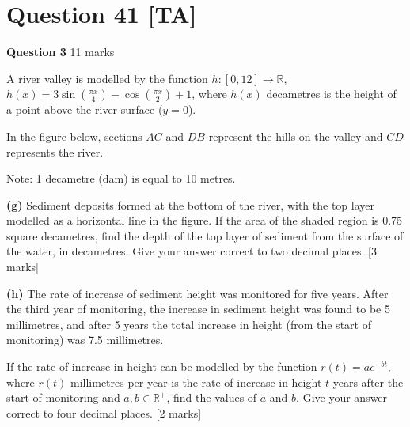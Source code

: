 \documentclass[10pt,a4paper]{article}
\begin{document}
\vspace{9\baselineskip}

\hrulefill

\section*{Question 41 [TA]}

\textbf{Question 3} \hfill 11 marks

A river valley is modelled by the function $h : [0,12] \to \mathbb{R}$, $h(x) = 3\sin\left(\frac{\pi x}{4}\right) - \cos\left(\frac{\pi x}{2}\right) + 1$, where $h(x)$ decametres is the height of a point above the river surface ($y = 0$).

In the figure below, sections $AC$ and $DB$ represent the hills on the valley and $CD$ represents the river.

\begin{center}
\end{center}

Note: 1 decametre (dam) is equal to 10 metres.

\textbf{(g)} Sediment deposits formed at the bottom of the river, with the top layer modelled as a horizontal line in the figure. If the area of the shaded region is 0.75 square decametres, find the depth of the top layer of sediment from the surface of the water, in decametres. Give your answer correct to two decimal places. \hfill [3 marks]

\vspace{9\baselineskip}

\textbf{(h)} The rate of increase of sediment height was monitored for five years. After the third year of monitoring, the increase in sediment height was found to be 5 millimetres, and after 5 years the total increase in height (from the start of monitoring) was 7.5 millimetres.

If the rate of increase in height can be modelled by the function $r(t) = ae^{-bt}$, where $r(t)$ millimetres per year is the rate of increase in height $t$ years after the start of monitoring and $a, b \in \mathbb{R}^+$, find the values of $a$ and $b$. Give your answer correct to four decimal places. \hfill [2 marks]

\vspace{9\baselineskip}
\end{document}
